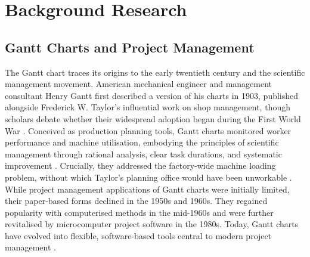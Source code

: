 \documentclass[12pt,nonacm,acmlarge,titlepage,screen]{acmart}
\begin{document}
\section{Background Research} \label{cha:back}

\subsection{Gantt Charts and Project Management} \label{sec:back_gantt_and_proj}

The Gantt chart traces its origins to the early twentieth century and the scientific management movement. American mechanical engineer and management consultant Henry Gantt first described a version of his charts in 1903, published alongside Frederick W. Taylor's influential work on shop management, though scholars debate whether their widespread adoption began during the First World War \cite{WILSON2003430}. Conceived as production planning tools, Gantt charts monitored worker performance and machine utilisation, embodying the principles of scientific management through rational analysis, clear task durations, and systematic improvement \cite{WILSON2003430}. Crucially, they addressed the factory-wide machine loading problem, without which Taylor's planning office would have been unworkable \cite{WILSON2003430}. While project management applications of Gantt charts were initially limited, their paper-based forms declined in the 1950s and 1960s. They regained popularity with computerised methods in the mid-1960s and were further revitalised by microcomputer project software in the 1980s. Today, Gantt charts have evolved into flexible, software-based tools central to modern project management \cite{WILSON2003430}.
\end{document}
